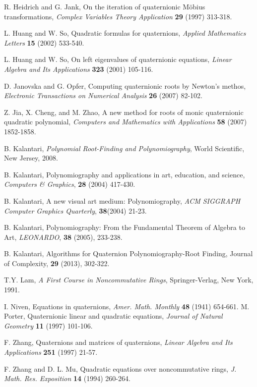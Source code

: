 \documentclass{article}
\theoremstyle{definition}
\begin{document}
\begin{thebibliography}{9}


 R. Heidrich and G. Jank, On the iteration of quaternionic M\"obius transformations,  \emph{Complex Variables Theory Application} \textbf{29} (1997) 313-318.\filbreak

 L. Huang and W. So, Quadratic formulas for quaternions,  \emph{Applied Mathematics Letters} \textbf{15} (2002) 533-540.\filbreak

 L. Huang and W. So, On left eigenvalues of quaternionic equations,  \emph{Linear Algebra and Its Applications} \textbf{323} (2001) 105-116.\filbreak

 D. Janovska and G. Opfer, Computing quaternionic roots by Newton's methos,  \emph{Electronic Transactions on Numerical Analysis} \textbf{26} (2007) 82-102.\filbreak

 Z. Jia, X. Cheng, and M. Zhao, A new method for roots of monic quaternionic quadratic polynomial,  \emph{Computers and Mathematics with Applications} \textbf{58} (2007) 1852-1858.\filbreak

 B. Kalantari, \textit{Polynomial Root-Finding and Polynomiography}, World Scientific, New Jersey, 2008.\filbreak

 B. Kalantari, Polynomiography and applications in art, education, and science,  \emph{Computers \& Graphics}, \textbf{28} (2004) 417-430.

 B. Kalantari, A new visual art medium: Polynomiography, \emph{ACM SIGGRAPH Computer Graphics Quarterly},
\textbf{38}(2004) 21-23. \filbreak

 B. Kalantari, Polynomiography: From the
Fundamental Theorem of Algebra to Art, \emph{LEONARDO}, \textbf{38}
(2005), 233-238.\filbreak

 B. Kalantari, Algorithms for Quaternion
Polynomiography-Root Finding,
Journal of Complexity,  \textbf{29}  (2013), 302-322. \filbreak

 T.Y. Lam, \textit{A First Course in Noncommutative Rings}, Springer-Verlag, New York, 1991.\filbreak

 I. Niven, Equations in quaternions,  \emph{Amer. Math. Monthly} \textbf{48} (1941) 654-661.\filbreak
{} M. Porter, Quaternionic linear and quadratic equations,  \emph{Journal of Natural Geometry} \textbf{11} (1997) 101-106.\filbreak

 F. Zhang, Quaternions and matrices of quaternions,  \emph{Linear Algebra and Its Applications} \textbf{251} (1997) 21-57.\filbreak

 F. Zhang and D. L. Mu, Quadratic equations over noncommutative rings,  \emph{J. Math. Res. Exposition} \textbf{14} (1994) 260-264.\filbreak

\end{thebibliography}

\bigskip
\end{document}
